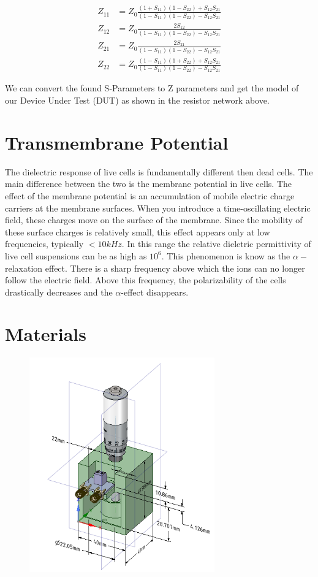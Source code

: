 \documentclass[journal]{IEEEtran}
\begin{document}
\begin{align*}
\label{s-conversion-z}
Z_{11} &= Z_0\frac{(1+S_{11})(1-S_{22})+S_{12}S_{21}}{ (1-S_{11})(1-S_{22})-S_{12}S_{21}} \\
Z_{12} &= Z_0\frac{2S_{12}}{ (1-S_{11})(1-S_{22})-S_{12}S_{21}} \\
Z_{21} &= Z_0\frac{2S_{21}}{ (1-S_{11})(1-S_{22})-S_{12}S_{21}} \\
Z_{22} &= Z_0\frac{ (1-S_{11})(1+S_{22})+S_{12}S_{21}}{ (1-S_{11})(1-S_{22})-S_{12}S_{21}}
\end{align*}

We can convert the found S-Parameters to Z parameters and get the model of our Device Under Test (DUT) as shown in the resistor network above.

\section{Transmembrane Potential}
The dielectric response of live cells is fundamentally different then dead cells. The main difference between the two is the membrane potential in live cells. The effect of the membrane potential is an accumulation of mobile electric charge carriers at the membrane surfaces. When you introduce a time-oscillating electric field, these charges move on the surface of the membrane. Since the mobility of these surface charges is relatively small, this effect appears only at low frequencies, typically $<10kHz$. In this range the relative dieletric permittivity of live cell suspensions can be as high as $10^6$. This phenomenon is know as the $\alpha-$relaxation effect\cite{dielectric-response}. There is a sharp frequency above which the ions can no longer follow the electric field. Above this frequency, the polarizability of the cells drastically decreases and the $\alpha$-effect disappears.

\section{Materials}

\begin{figure}[h]
\label{test-fixture}
\includegraphics[width=8cm]{Combined_Test_Fixture.png}
\end{figure}
\end{document}
